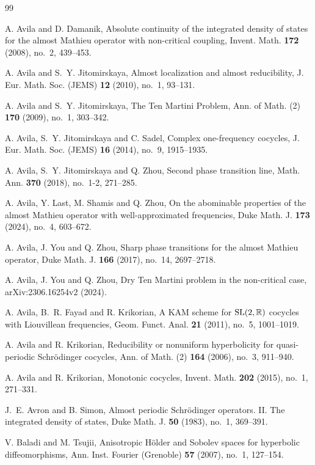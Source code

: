 \documentclass[reqno,11pt]{amsart}
\newcommand{\R}{{\mathbb R}}
\begin{document}
\begin{thebibliography}{99}
    


A. Avila and D. Damanik, Absolute continuity of the integrated density of states for the almost Mathieu operator with non-critical coupling, Invent. Math. {\bf 172} (2008), no.~2, 439--453.

A. Avila and S.~Y. Jitomirskaya, Almost localization and almost reducibility, J. Eur. Math. Soc. (JEMS) {\bf 12} (2010), no.~1, 93--131.

A. Avila and S.~Y. Jitomirskaya, The Ten Martini Problem, Ann. of Math. (2) {\bf 170} (2009), no.~1, 303--342.


A. Avila, S.~Y. Jitomirskaya and C. Sadel, Complex one-frequency cocycles, J. Eur. Math. Soc. (JEMS) {\bf 16} (2014), no.~9, 1915--1935.

A. Avila, S.~Y. Jitomirskaya and Q. Zhou, Second phase transition line, Math. Ann. {\bf 370} (2018), no.~1-2, 271--285.

A. Avila, Y. Last, M. Shamis and Q. Zhou, On the abominable properties of the almost Mathieu operator with well-approximated frequencies, Duke Math. J. {\bf 173} (2024), no.~4, 603--672.

A. Avila, J. You and Q. Zhou, Sharp phase transitions for the almost Mathieu operator, Duke Math. J. {\bf 166} (2017), no.~14, 2697--2718.


A. Avila, J. You and Q. Zhou, Dry Ten Martini problem in the non-critical case, arXiv:2306.16254v2 (2024).

A. Avila, B.~R. Fayad and R. Krikorian, A KAM scheme for ${\rm SL}(2,\R)$ cocycles with Liouvillean frequencies, Geom. Funct. Anal. {\bf 21} (2011), no.~5, 1001--1019.

A. Avila and R. Krikorian, Reducibility or nonuniform hyperbolicity for quasi-periodic Schr\"odinger cocycles, Ann. of Math. (2) {\bf 164} (2006), no.~3, 911--940.

A. Avila and R. Krikorian, Monotonic cocycles, Invent. Math. {\bf 202} (2015), no.~1, 271--331.

J.~E. Avron and B. Simon, Almost periodic Schr\"odinger operators. II. The integrated density of states, Duke Math. J. {\bf 50} (1983), no.~1, 369--391.

V. Baladi and M. Tsujii, Anisotropic H\"older and Sobolev spaces for hyperbolic diffeomorphisms, Ann. Inst. Fourier (Grenoble) {\bf 57} (2007), no.~1, 127--154.


\end{thebibliography}
\end{document}
